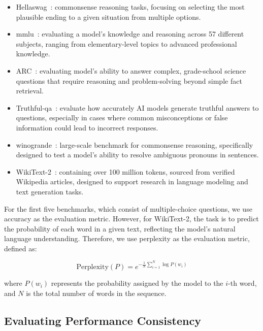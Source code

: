 \begin{itemize}[noitemsep,leftmargin=8pt, topsep=3pt]
    \item Hellaswag~\cite{hellaswag}: commonsense reasoning tasks, focusing on selecting the most plausible ending to a given situation from multiple options.
    \item mmlu~\cite{hendrycks2020measuring}: evaluating a model’s knowledge and reasoning across 57 different subjects, ranging from elementary-level topics to advanced professional knowledge.
    \item ARC~\cite{clark2018thinksolvedquestionanswering}: evaluating model's ability to answer complex, grade-school science questions that require reasoning and problem-solving beyond simple fact retrieval.
    \item Truthful-qa~\cite{lin2021truthfulqa}: evaluate how accurately AI models generate truthful answers to questions, especially in cases where common misconceptions or false information could lead to incorrect responses.
    \item winogrande~\cite{ai2:winogrande}: large-scale benchmark for commonsense reasoning, specifically designed to test a model's ability to resolve ambiguous pronouns in sentences.
    \item WikiText-2~\cite{merity2016pointer}: containing over 100 million tokens, sourced from verified Wikipedia articles, designed to support research in language modeling and text generation tasks.

\end{itemize}

For the first five benchmarks, which consist of multiple-choice questions, we use accuracy as the evaluation metric. However, for WikiText-2, the task is to predict the probability of each word in a given text, reflecting the model's natural language understanding. Therefore, we use perplexity as the evaluation metric, defined as:

\begin{equation} \text{Perplexity}(P) = e^{-\frac{1}{N} \sum_{i=1}^{N} \log P(w_i)} \end{equation}

where $P(w_i)$ represents the probability assigned by the model to the $i$-th word, and $N$ is the total number of words in the sequence.

\subsection{Evaluating Performance Consistency}
\label{sec:setStability}
\\

